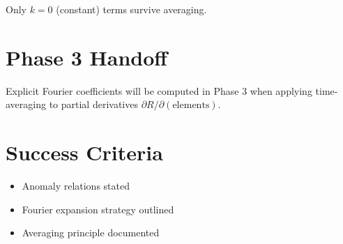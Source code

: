 \documentclass[11pt]{article}
\begin{document}
Only $k=0$ (constant) terms survive averaging.

\section{Phase 3 Handoff}

Explicit Fourier coefficients will be computed in Phase 3 when applying time-averaging to partial derivatives $\partial R/\partial(\text{elements})$.

\section{Success Criteria}
\begin{itemize}
    \item[$\checkmark$] Anomaly relations stated
    \item[$\checkmark$] Fourier expansion strategy outlined
    \item[$\checkmark$] Averaging principle documented
\end{itemize}
\end{document}
